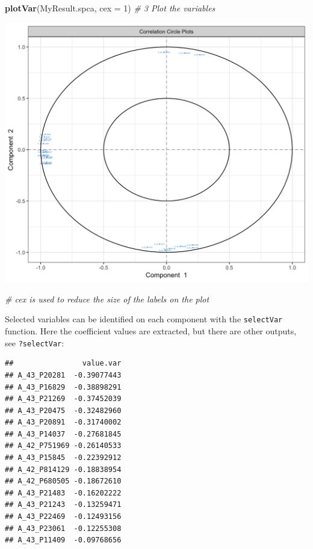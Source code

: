 \documentclass[]{book}
\newenvironment{Shaded}{\begin{snugshade}}{\end{snugshade}}
\newcommand{\KeywordTok}[1]{\textcolor[rgb]{0.13,0.29,0.53}{\textbf{#1}}}
\newcommand{\DataTypeTok}[1]{\textcolor[rgb]{0.13,0.29,0.53}{#1}}
\newcommand{\DecValTok}[1]{\textcolor[rgb]{0.00,0.00,0.81}{#1}}
\newcommand{\CommentTok}[1]{\textcolor[rgb]{0.56,0.35,0.01}{\textit{#1}}}
\newcommand{\OperatorTok}[1]{\textcolor[rgb]{0.81,0.36,0.00}{\textbf{#1}}}
\newcommand{\NormalTok}[1]{#1}
\theoremstyle{definition}
\theoremstyle{definition}
\theoremstyle{definition}
\theoremstyle{remark}
\begin{document}
\begin{Shaded}
\begin{Highlighting}[]
\KeywordTok{plotVar}\NormalTok{(MyResult.spca, }\DataTypeTok{cex =} \DecValTok{1}\NormalTok{)                                        }\CommentTok{# 3 Plot the variables}
\end{Highlighting}
\end{Shaded}

\begin{center}\includegraphics[width=0.5\linewidth]{Figures/unnamed-chunk-10-2} \end{center}

\begin{Shaded}
\begin{Highlighting}[]
\CommentTok{# cex is used to reduce the size of the labels on the plot}
\end{Highlighting}
\end{Shaded}

Selected variables can be identified on each component with the
\texttt{selectVar} function. Here the coefficient values are extracted,
but there are other outputs, see \texttt{?selectVar}:

\begin{Shaded}
\end{Shaded}

\begin{verbatim}
##                value.var
## A_43_P20281  -0.39077443
## A_43_P16829  -0.38898291
## A_43_P21269  -0.37452039
## A_43_P20475  -0.32482960
## A_43_P20891  -0.31740002
## A_43_P14037  -0.27681845
## A_42_P751969 -0.26140533
## A_43_P15845  -0.22392912
## A_42_P814129 -0.18838954
## A_42_P680505 -0.18672610
## A_43_P21483  -0.16202222
## A_43_P21243  -0.13259471
## A_43_P22469  -0.12493156
## A_43_P23061  -0.12255308
## A_43_P11409  -0.09768656
\end{verbatim}
\end{document}
